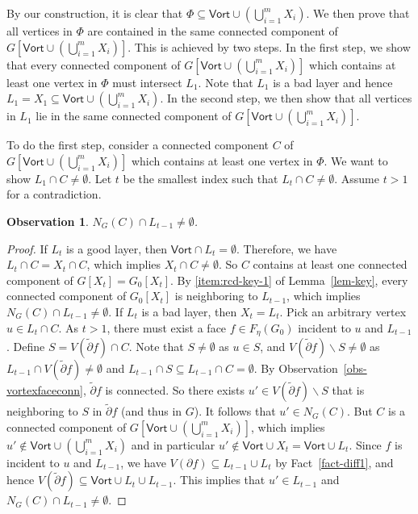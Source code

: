 \documentclass[a4paper,11pt]{article}
\numberwithin{lemma}{section}
\newtheorem{observation}[lemma]{Observation}
\begin{document}
By our construction, it is clear that $\varPhi \subseteq \mathsf{Vort} \cup (\bigcup_{i=1}^m X_i)$.
We then prove that all vertices in $\varPhi$ are contained in the same connected component of $G[\mathsf{Vort} \cup (\bigcup_{i=1}^m X_i)]$.
This is achieved by two steps.
In the first step, we show that every connected component of $G[\mathsf{Vort} \cup (\bigcup_{i=1}^m X_i)]$ which contains at least one vertex in $\varPhi$ must intersect $L_1$.
Note that $L_1$ is a bad layer and hence $L_1 = X_1 \subseteq \mathsf{Vort} \cup (\bigcup_{i=1}^m X_i)$.
In the second step, we then show that all vertices in $L_1$ lie in the same connected component of $G[\mathsf{Vort} \cup (\bigcup_{i=1}^m X_i)]$.

To do the first step, consider a connected component $C$ of $G[\mathsf{Vort} \cup (\bigcup_{i=1}^m X_i)]$ which contains at least one vertex in $\varPhi$.
We want to show $L_1 \cap C \neq \emptyset$.
Let $t$ be the smallest index such that $L_t \cap C \neq \emptyset$.
Assume $t>1$ for a contradiction.

\begin{observation}
$N_G(C) \cap L_{t-1} \neq \emptyset$.
\end{observation}
\begin{proof}
If $L_t$ is a good layer, then $\mathsf{Vort} \cap L_t = \emptyset$.
Therefore, we have $L_t \cap C = X_t \cap C$, which implies $X_t \cap C \neq \emptyset$.
So $C$ contains at least one connected component of $G[X_t] = G_0[X_t]$.
By \ref{item:rcd-key-1} of Lemma~\ref{lem-key}, every connected component of $G_0[X_t]$ is neighboring to $L_{t-1}$, which implies $N_G(C) \cap L_{t-1} \neq \emptyset$.
If $L_t$ is a bad layer, then $X_t = L_t$.
Pick an arbitrary vertex $u \in L_t \cap C$.
As $t>1$, there must exist a face $f \in F_\eta(G_0)$ incident to $u$ and $L_{t-1}$.
Define $S = V(\tilde{\partial} f) \cap C$.
Note that $S \neq \emptyset$ as $u \in S$, and $V(\tilde{\partial} f) \backslash S \neq \emptyset$ as $L_{t-1} \cap V(\tilde{\partial} f) \neq \emptyset$ and $L_{t-1} \cap S \subseteq L_{t-1} \cap C = \emptyset$.
By Observation~\ref{obs-vortexfaceconn}, $\tilde{\partial} f$ is connected.
So there exists $u' \in V(\tilde{\partial} f) \backslash S$ that is neighboring to $S$ in $\tilde{\partial} f$ (and thus in $G$).
It follows that $u' \in N_G(C)$.
But $C$ is a connected component of $G[\mathsf{Vort} \cup (\bigcup_{i=1}^m X_i)]$, which implies $u' \notin \mathsf{Vort} \cup (\bigcup_{i=1}^m X_i)$ and in particular $u' \notin \mathsf{Vort} \cup X_t = \mathsf{Vort} \cup L_t$.
Since $f$ is incident to $u$ and $L_{t-1}$, we have $V(\partial f) \subseteq L_{t-1} \cup L_t$ by Fact~\ref{fact-diff1}, and hence $V(\tilde{\partial} f) \subseteq \mathsf{Vort} \cup L_t \cup L_{t-1}$.
This implies that $u' \in L_{t-1}$ and $N_G(C) \cap L_{t-1} \neq \emptyset$.
\end{proof}
\end{document}
